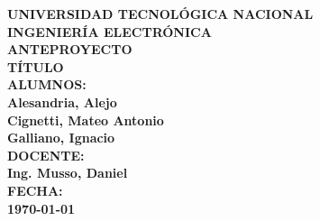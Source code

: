 \begin{titlepage}
    \centering
    \vspace*{2cm}
    
    \textbf{\Large{UNIVERSIDAD TECNOLÓGICA NACIONAL}} \\ [0.3cm]
    
    \textbf{\Large{INGENIERÍA ELECTRÓNICA}}\\ [2cm]
    
    \textbf{\Huge{ANTEPROYECTO}}\\ [2cm]
    
    \textbf{\Large{TÍTULO}}\\ [6cm]
    
    \textbf{\Large{ALUMNOS:}}\\
    \textbf{Alesandria, Alejo}\\
    \textbf{Cignetti, Mateo Antonio}\\
    \textbf{Galliano, Ignacio}\\[1cm]
    
    \textbf{\Large{DOCENTE:}}\\
    \textbf{Ing. Musso, Daniel}\\[1cm]
    
    \textbf{\Large{FECHA:}}\\[0.3cm]
    \textbf{\today}\\[3cm]
    
    \vfill
\end{titlepage}